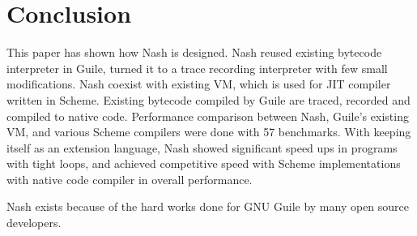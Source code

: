 \documentclass[preprint, 10pt]{sigplanconf}
\begin{document}
\section{Conclusion}
\label{sec:conclusion}
This paper has shown how Nash is designed. Nash reused existing bytecode
interpreter in Guile, turned it to a trace recording interpreter with few
small modifications. Nash coexist with existing VM, which is used for JIT
compiler written in Scheme. Existing bytecode compiled by Guile are traced,
recorded and compiled to native code. Performance comparison between Nash,
Guile's existing VM, and various Scheme compilers were done with 57
benchmarks. With keeping itself as an extension language, Nash showed
significant speed ups in programs with tight loops, and achieved competitive
speed with Scheme implementations with native code compiler in overall
performance.


\acks{} Nash exists because of the hard works done for GNU Guile by many open
source developers.







\end{document}

